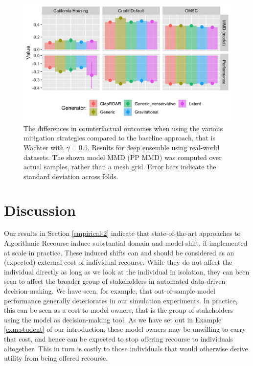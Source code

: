 \documentclass[conference,final,]{IEEEtran}
\theoremstyle{definition}
\theoremstyle{definition}
\theoremstyle{definition}
\theoremstyle{definition}
\theoremstyle{remark}
\begin{document}
\begin{figure}

{\centering \includegraphics[width=0.9\linewidth]{www/mitigation_real_world_results} 

}

\caption{The differences in counterfactual outcomes when using the various mitigation strategies compared to the baseline approach, that is Wachter with $\gamma=0.5$. Results for deep ensemble using real-world datasets. The shown model MMD (PP MMD) was computed over actual samples, rather than a mesh grid. Error bars indicate the standard deviation across folds.}\label{fig:mitigate-real-world-results}
\end{figure}

\hypertarget{discussion}{%
\section{Discussion}\label{discussion}}

Our results in Section \ref{empirical-2} indicate that state-of-the-art approaches to Algorithmic Recourse induce substantial domain and model shift, if implemented at scale in practice. These induced shifts can and should be considered as an (expected) external cost of individual recourse. While they do not affect the individual directly as long as we look at the individual in isolation, they can been seen to affect the broader group of stakeholders in automated data-driven decision-making. We have seen, for example, that out-of-sample model performance generally deteriorates in our simulation experiments. In practice, this can be seen as a cost to model owners, that is the group of stakeholders using the model as decision-making tool. As we have set out in Example \ref{exm:student} of our introduction, these model owners may be unwilling to carry that cost, and hence can be expected to stop offering recourse to individuals altogether. This in turn is costly to those individuals that would otherwise derive utility from being offered recourse.
\end{document}
